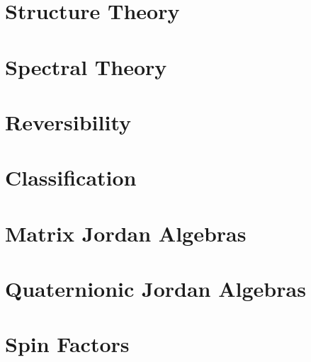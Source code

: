 \documentclass[11pt,a4paper]{report}
\theoremstyle{definition}
\begin{document}
\chapter{Structure Theory}







\chapter{Spectral Theory}


\chapter{Reversibility}


\chapter{Classification}




\chapter{Matrix Jordan Algebras}







\chapter{Quaternionic Jordan Algebras}





\chapter{Spin Factors}


\end{document}
